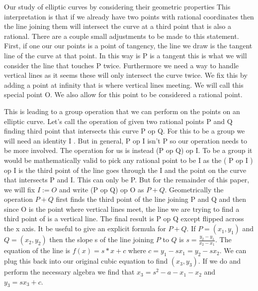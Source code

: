 \documentclass{article}
\begin{document}
Our study of elliptic curves by considering their geometric properties This interpretation is that if we already have two points with rational coordinates then the line joining them will intersect the curve at a third point that is also a rational. There are a couple small adjustments to be made to this statement. First, if one our our points is a point of tangency, the line we draw is the tangent line of the curve at that point. In this way is P is a tangent this is what we will consider the line that touches P twice. Furthermore we need a way to handle vertical lines as it seems these will only intersect the curve twice. We fix this by adding a point at infinity that is where vertical lines meeting. We will call this special point O. We also allow for this point to be considered a rational point.  

This is leading to a group operation that we can perform on the points on an elliptic curve. Let's call the operation of given two rational points P and Q finding third point that intersects this curve P op Q. For this to be a group we will need an identity I . But in general, P op I isn't P so our operation needs to be more involved. The operation for us is instead (P op Q) op I. To be a group it would be mathematically valid to pick any rational point to be I as the ( P op I ) op I is the third point of the line goes through the I and the point on the curve that intersects P and I. This can only be P. But for the remainder of this paper, we will fix $I := O$ and write (P op Q) op O as $P + Q$. Geometrically the operation $P + Q$ first finds the third point of the line joining P and Q and then since O is the point where vertical lines meet, the line we are trying to find a third point of is a vertical line. The final result is P op Q except flipped across the x axis. It be useful to give an explicit formula for $P + Q$. If $P = (x_1, y_1)$ and $Q = (x_2, y_2)$ then the slope s of the line joining $P$ to $Q$ is $s = \frac{y_2 - y_1}{x_2 - x_1}$. The equation of the line is $f(x) = s *x + c$ where $c = y_1 - s x_1  = y_2 - s x_2$. We can plug this back into our original cubic equation to find $(x_3, y_3)$. If we do and perform the necessary algebra we find that $x_3 = s^2 -a - x_1 - x_2$ and $y_3 = sx_3 + c$. 
\end{document}
